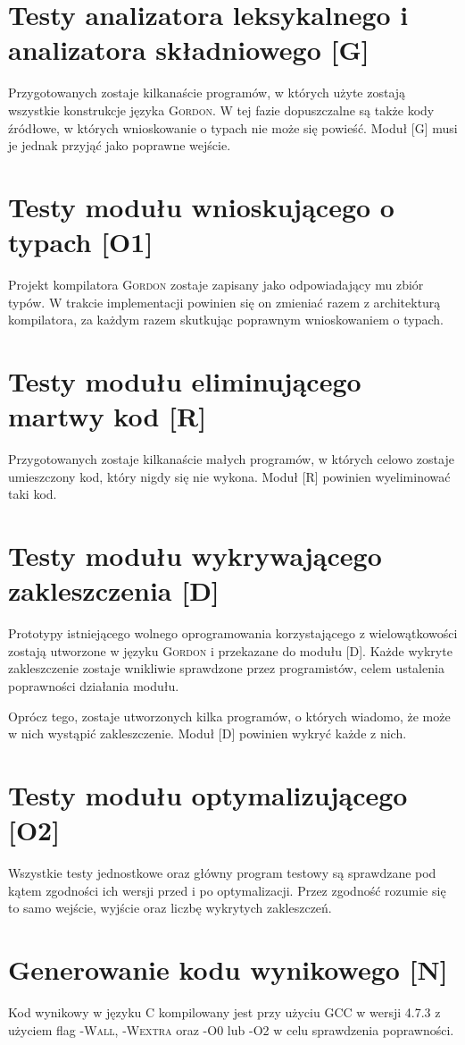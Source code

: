 \documentclass{documentation}
\begin{document}
\section{Testy analizatora leksykalnego i analizatora składniowego [G]}
\noindent Przygotowanych zostaje kilkanaście programów, w których użyte
zostają wszystkie konstrukcje języka \textsc{Gordon}. W tej fazie dopuszczalne
są także kody źródłowe, w których wnioskowanie o typach nie może się powieść.
Moduł [G] musi je jednak przyjąć jako poprawne wejście.

\section{Testy modułu wnioskującego o typach [O1]}
\noindent Projekt kompilatora \textsc{Gordon} zostaje zapisany jako
odpowiadający mu zbiór typów. W trakcie implementacji powinien się on zmieniać
razem z architekturą kompilatora, za każdym razem skutkując poprawnym
wnioskowaniem o typach.

\section{Testy modułu eliminującego martwy kod [R]}
\noindent Przygotowanych zostaje kilkanaście małych programów, w których celowo
zostaje umieszczony kod, który nigdy się nie wykona. Moduł [R] powinien
wyeliminować taki kod.

\section{Testy modułu wykrywającego zakleszczenia [D]}
\noindent Prototypy istniejącego wolnego oprogramowania korzystającego z
wielowątkowości zostają utworzone w języku \textsc{Gordon} i przekazane do
modułu [D]. Każde wykryte zakleszczenie zostaje wnikliwie sprawdzone przez
programistów, celem ustalenia poprawności działania modułu.

Oprócz tego, zostaje utworzonych kilka programów, o których wiadomo, że może w
nich wystąpić zakleszczenie. Moduł [D] powinien wykryć każde z nich.

\section{Testy modułu optymalizującego [O2]}
\noindent Wszystkie testy jednostkowe oraz główny program testowy są sprawdzane
pod kątem zgodności ich wersji przed i po optymalizacji. Przez zgodność rozumie
się to samo wejście, wyjście oraz liczbę wykrytych zakleszczeń.

\section{Generowanie kodu wynikowego [N]}
\noindent Kod wynikowy w języku \textsc{C} kompilowany jest przy użyciu
\textsc{GCC} w wersji 4.7.3 z użyciem flag \textsc{-Wall}, \textsc{-Wextra} oraz
\textsc{-O0} lub \textsc{-O2} w celu sprawdzenia poprawności.
\end{document}
